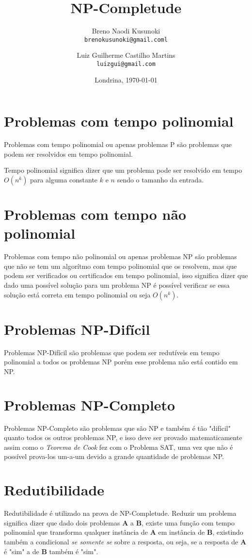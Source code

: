 \documentclass[12pt,a4papper]{article}
\title{NP-Completude}
\author{Breno Naodi Kusunoki \\
        \texttt{brenokusunoki@gmail.coml}
        \and 
        Luiz Guilherme Castilho Martins \\
        \texttt{luizgui@gmail.com}
}
\date{Londrina, \today}
\begin{document}
\maketitle
\thispagestyle{empty}
\newpage

\tableofcontents
\thispagestyle{empty}
\newpage

\section{Problemas com tempo polinomial}
Problemas com tempo polinomial ou apenas problemas P são problemas que podem ser resolvidos em tempo polinomial.

Tempo polinomial significa dizer que um problema pode ser resolvido em tempo $O(n^k)$ para alguma constante $k$ e $n$ sendo o tamanho da entrada.

\section{Problemas com tempo não polinomial}
Problemas com tempo não polinomial ou apenas problemas NP são problemas que não se tem um algorítmo com tempo polinomial que os resolvem, mas que podem ser verificados ou certificados em tempo polinomial, isso significa dizer que dado uma possível solução para um problema NP é possível verificar se essa solução está correta em tempo polinomial ou seja $O(n^k)$.

\section{Problemas NP-Difícil}
Problemas NP-Difícil são problemas que podem ser redutíveis em tempo polinomial a todos os problemas NP porém esse problema não está contido em NP.

\section{Problemas NP-Completo}
Problemas NP-Completo são problemas que são NP e também é tão "difícil" quanto todos os outros problemas NP, e isso deve ser provado matematicamente assim como o \textit{Teorema de Cook} fez com o Problema SAT, uma vez que não é possível prova-los um-a-um devido a grande quantidade de problemas NP.

\section{Redutibilidade}
Redutibilidade é utilizado na prova de NP-Completude. Reduzir um problema significa dizer que dado dois problemas \textbf{A} a \textbf{B}, existe uma função com tempo polinomial que transforma qualquer instância de \textbf{A} em instância de \textbf{B}, existindo também a condicional \textit{se somente se} sobre a resposta, ou seja, se a resposta de \textbf{A} é "sim" a de \textbf{B} também é "sim".
\end{document}
